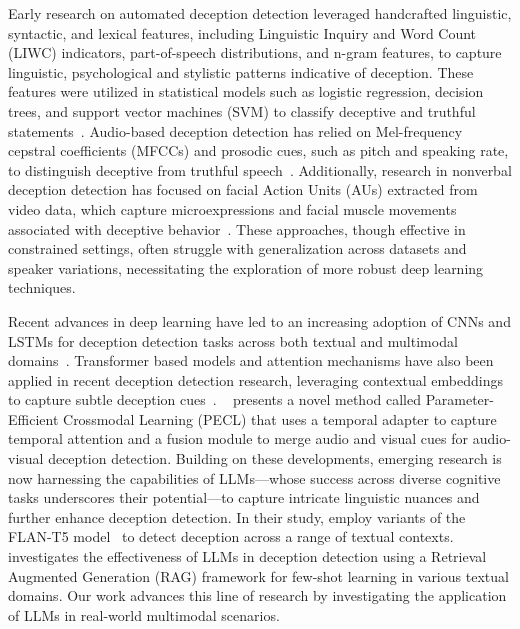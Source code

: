 Early research on automated deception detection leveraged handcrafted linguistic, syntactic, and lexical features, including Linguistic Inquiry and Word Count (LIWC) indicators, part-of-speech distributions, and n-gram features, to capture linguistic, psychological and stylistic patterns indicative of deception. These features were utilized in statistical models such as logistic regression, decision trees, and support vector machines (SVM) to classify deceptive and truthful statements~\cite{opspam, rltd, levitan-etal-2018-linguistic, Ekman2001, LIWC3, LIWC4}. Audio-based deception detection has relied on Mel-frequency cepstral coefficients (MFCCs) and prosodic cues, such as pitch and speaking rate, to distinguish deceptive from truthful speech~\cite{Hirschberg2005DeceptiveSpeech, levitan-etal-2018-linguistic, Bai2019AutomaticLD, BoL, Chebbi2021DeceptionDU}. Additionally, research in nonverbal deception detection has focused on facial Action Units (AUs) extracted from video data, which capture microexpressions and facial muscle movements associated with deceptive behavior~\cite{Ekman2001, fau1, Bai2019AutomaticLD, LIWC3, mathur2021affectawaredeepbeliefnetwork}. These approaches, though effective in constrained settings, often struggle with generalization across datasets and speaker variations, necessitating the exploration of more robust deep learning techniques.

Recent advances in deep learning have led to an increasing adoption of CNNs and LSTMs for deception detection tasks across both textual and multimodal domains~\cite{DL5, DL2, DL4, DL3, DL1}. Transformer based models and attention mechanisms have also been applied in recent deception detection research, leveraging contextual embeddings to capture subtle deception cues~\cite{tr1, tr2, tr3}. ~\cite{dolos} presents a novel method called Parameter-Efficient Crossmodal Learning (PECL) that uses a temporal adapter to capture temporal attention and a fusion module to merge audio and visual cues for audio-visual deception detection. Building on these developments, emerging research is now harnessing the capabilities of LLMs—whose success across diverse cognitive tasks underscores their potential—to capture intricate linguistic nuances and further enhance deception detection. In their study, \cite{LLM1} employ variants of the FLAN-T5 model~\cite{Flant5} to detect deception across a range of textual contexts. \cite{LLM2} investigates the effectiveness of LLMs in deception detection using a Retrieval Augmented Generation (RAG) framework for few-shot learning in various textual domains. Our work advances this line of research by investigating the application of LLMs in real-world multimodal scenarios.